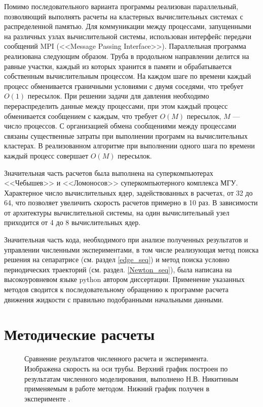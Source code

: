 Помимо последовательного варианта программы реализован параллельный, позволяющий выполнять расчеты на кластерных вычислительных системах с распределенной памятью. Для коммуникации между процессами, запущенными на различных узлах вычислительной системы, использован интерфейс передачи сообщений MPI (<<Message Passing Interface>>). Параллельная программа реализована следующим образом. Труба в продольном направлении делится на равные участки, каждый из которых хранится в памяти и обрабатывается собственным вычислительным процессом. На каждом шаге по времени каждый процесс обменивается граничными условиями с двумя соседями, что требует $O(1)$ пересылок. При решении задачи для давления необходимо перераспределить данные между процессами, при этом каждый процесс обменивается сообщением с каждым, что требует $O(M)$ пересылок, $M$ --- число процессов. С организацией обмена сообщениями между процессами связаны существенные затраты при выполнении программ на вычислительных кластерах. В  реализованном алгоритме при выполнении одного шага по времени каждый процесс совершает $O(M)$ пересылок.

Значительная часть расчетов была выполнена на суперкомпьютерах <<Чебышев>> и <<Ломоносов>> суперкомпьютерного комплекса МГУ. Характерное число вычислительных ядер, задействованных в расчетах, от 32 до 64, что позволяет увеличить скорость расчетов примерно в 10 раз. В зависимости от архитектуры вычислительной системы, на один вычислительный узел приходится от 4 до 8 вычислительных ядер.

Значительная часть кода, необходимого при анализе полученных результатов и управлении численными экспериментами, в том числе реализующая метод поиска решения на сепаратрисе (см. раздел \ref{edge_seq}) и метод поиска условно периодических траекторий (см. раздел. \ref{Newton_seq}), была написана на высокоуровневом языке python автором диссертации. Применение указанных методов сводится к последовательному обращению к программе расчета движения жидкости с правильно подобранными начальными данными. 


\section{Методические расчеты} \label{puff_calc}

\begin{figure}[h]
\caption{Сравнение результатов численного расчета и эксперимента. Изображена скорость на оси трубы. Верхний график построен по результатам численного моделирования, выполнено Н.В. Никитиным применяемым в работе методом. Нижний график получен в эксперименте \cite{Wygnanski1973}.}
\label{exper_img}
\end{figure}

